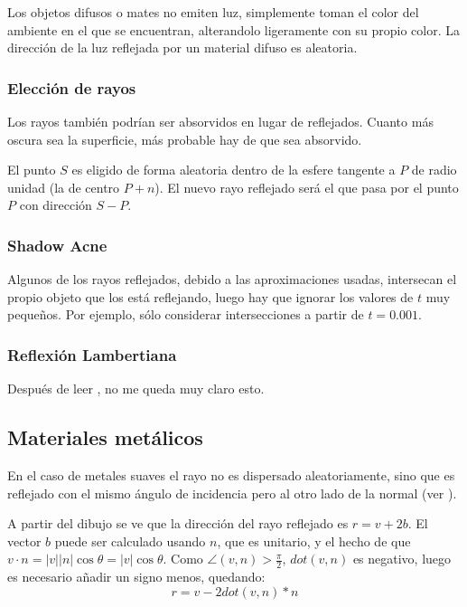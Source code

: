 Los objetos difusos o mates no emiten luz, simplemente toman el color del ambiente en el que se encuentran, alterandolo ligeramente con su propio color. La dirección de la luz reflejada por un material difuso es aleatoria.


\subsubsection{Elección de rayos}

Los rayos también podrían ser absorvidos en lugar de reflejados. Cuanto más oscura sea la superficie, más probable hay de que sea absorvido.


El punto $S$ es eligido de forma aleatoria dentro de la esfere tangente a $P$ de radio unidad (la de centro $P+n$). El nuevo rayo reflejado será el que pasa por el punto $P$ con dirección $S-P$.

\subsubsection{Shadow Acne}

Algunos de los rayos reflejados, debido a las aproximaciones usadas, intersecan el propio objeto que los está reflejando, luego hay que ignorar los valores de $t$ muy pequeños. Por ejemplo, sólo considerar intersecciones a partir de $t=0.001$.

\subsubsection{Reflexión Lambertiana}

Después de leer \cite{lambertian}, no me queda muy claro esto.

\subsection{Materiales metálicos}

En el caso de metales suaves el rayo no es dispersado aleatoriamente, sino que es reflejado con el mismo ángulo de incidencia pero al otro lado de la normal (ver \cite{beam}).


A partir del dibujo se ve que la dirección del rayo reflejado es $r=v+2b$. El vector $b$ puede ser calculado usando $n$, que es unitario, y el hecho de que $v\cdot n=|v||n|\cos\theta=|v|\cos\theta$. Como $\angle (v,n)> \frac{\pi}{2}$, $dot(v,n)$ es negativo, luego es necesario añadir un signo menos, quedando:
\[
r=v-2dot(v,n)*n
\]

